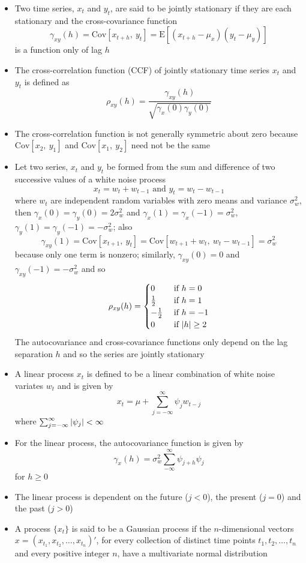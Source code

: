 \documentclass[12pt]{article}
\newcommand{\expe}[1]{\text{E}\left[ #1 \right]}
\newcommand{\cov}[2]{\text{Cov}\left[#1, ~#2\right]}
\begin{document}
\begin{itemize}
\item Two time series, $x_t$ and $y_t$, are said to be jointly stationary if they are each stationary and the cross-covariance function $$ \gamma_{xy}(h) = \cov{x_{t+h}}{y_t} = \expe{(x_{t+h} - \mu_x)(y_t - \mu_y)} $$ is a function only of lag $h$ 
\item The cross-correlation function (CCF) of jointly stationary time series $x_t$ and $y_t$ is defined as $$ \rho_{xy}(h) = \frac{\gamma_{xy}(h)}{\sqrt{\gamma_x(0)\gamma_y(0)}} $$ 
\item The cross-correlation function is not generally symmetric about zero because $\cov{x_2}{y_1}$ and $\cov{x_1}{y_2}$ need not be the same
\item Let two series, $x_t$ and $y_t$ be formed from the sum and difference of two successive values of a white noise process $$ x_t = w_t + w_{t-1} \text{ and } y_t = w_t - w_{t-1} $$ where $w_t$ are independent random variables with zero means and variance $\sigma^2_w$, then $\gamma_x(0) = \gamma_y(0) = 2\sigma^2_w$ and $\gamma_x(1) = \gamma_x(-1) = \sigma^2_w$, $\gamma_y(1) = \gamma_y(-1) = -\sigma^2_w$; also $$ \gamma_{xy}(1) = \cov{x_{t+1}}{y_t} = \cov{w_{t+1} + w_t}{w_t - w_{t-1}} = \sigma^2_w$$ because only one term is nonzero; similarly, $\gamma_{xy}(0) = 0$ and $\gamma_{xy}(-1) = -\sigma^2_w$ and so $$ \rho_{xy}(h) = \begin{cases} 0 &\text{ if } h = 0 \\ \frac{1}{2} &\text{ if } h = 1 \\ -\frac{1}{2} &\text{ if } h = -1 \\ 0 &\text{ if } \abs{h} \geq 2 \end{cases} $$ The autocovariance and cross-covariance functions only depend on the lag separation $h$ and so the series are jointly stationary 
\item A linear process $x_t$ is defined to be a linear combination of white noise variates $w_t$ and is given by $$ x_t = \mu + \sum_{j = -\infty}^\infty \psi_jw_{t-j} $$ where $\sum_{j = -\infty}^\infty \abs{\psi_j} < \infty $
\item For the linear process, the autocovariance function is given by $$ \gamma_x(h) = \sigma^2_w \sum_{-\infty}^\infty \psi_{j+h}\psi_j $$ for $h \geq 0$ 
\item The linear process is dependent on the future ($j < 0$), the present ($j=0$) and the past ($j > 0$)
\item A process $\{x_t\}$ is said to be a Gaussian process if the $n$-dimensional vectors $x = (x_{t_1}, x_{t_2},\dots,x_{t_n})'$, for every collection of distinct time points $t_1,t_2,\dots,t_n$ and every positive integer $n$, have a multivariate normal distribution 

\end{itemize}
\end{document}
